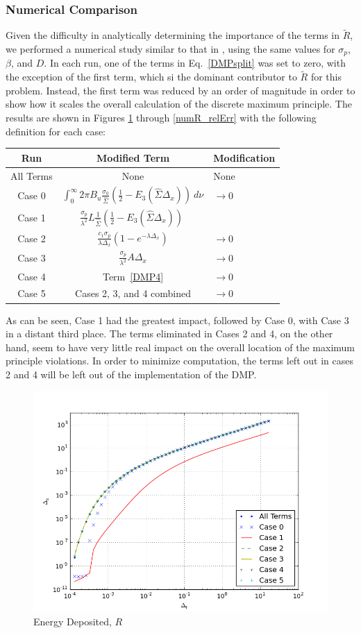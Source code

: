 \subsubsection{Numerical Comparison}
Given the difficulty in analytically determining the importance of the terms in
$\tilde R$, we performed a numerical study similar to that in \cite{WolLarDen},
using the
same values for $\sigma_p$, $\beta$, and $D$.  In each run, one of the terms
in
Eq.\ \eqref{DMPsplit} was set to zero, with the exception of the first term,
which si the dominant contributor to $\tilde R$ for this problem.  Instead, the
first term
was reduced by an order of magnitude in order to show how it scales the overall
calculation of the
discrete maximum principle.  The results are shown in Figures \ref{numR} through
\ref{numR_relErr} with the following definition for each case:
\begin{center}
\begin{tabular}{c c l}
Run & Modified Term & Modification  \\ \hline \medskip
All Terms & None &  None\\ \medskip
Case 0    & $\int_0^\infty2\pi B_u\frac{\sigma_0}{\hat\Sigma}
  \left(\frac{1}{2}-E_3(\hat\Sigma\Delta_x)\right)\ d\nu $& $\to 0$ \\ \medskip
Case 1    & $\frac{\sigma_p}{\lambda^2}L\frac{1}{\hat\Sigma}
  \left(\frac{1}{2}-E_3(\hat\Sigma\Delta_x)\right)\;$& \textdiv 10  \\ \medskip
Case 2    & $\frac{c_1\sigma_p}{\lambda\Delta_x} 
  \left(1-e^{-\lambda\Delta_x}\right) $ &$\to0$ \\ \medskip
Case 3    & $\frac{\sigma_p}{\lambda^2}A\Delta_x $ &$\to0$  \\ \medskip
Case 4    & Term\ \eqref{DMP4} & $\to0$  \\ \medskip
Case 5    & Cases 2, 3, and 4 combined &$\to0$
\end{tabular}
\end{center}
As can be seen, Case 1 had the greatest impact, followed by
Case 0, with Case 3 in a distant third place.  The terms
eliminated in Cases 2 and 4, on the other hand, seem to have very little real
impact on the overall location of the maximum principle violations.  In order to
minimize computation,
the terms left out in cases 2 and 4 will be left out of the
implementation of the DMP.

\begin{figure}[H]
\centering
\includegraphics[width=0.7\linewidth]{graphics/numR}
\caption{Energy Deposited, $R$}
\label{numR}
\end{figure}

